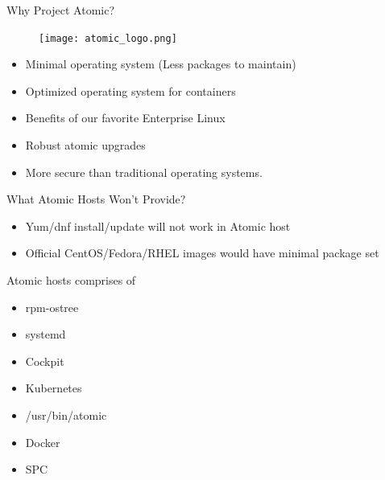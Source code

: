 \documentclass{beamer}
\begin{document}
\begin{frame}{Why Project Atomic?}
\begin{figure}[htp]
\centering
\texttt{[image: atomic\_logo.png]}
\label{}
\end{figure}
\begin{itemize}
  \item Minimal operating system (Less packages to maintain)
  \item Optimized operating system for containers
  \item Benefits of our favorite Enterprise Linux
  \item Robust atomic upgrades
  \item More secure than traditional operating systems.
\end{itemize}
\end{frame}

\begin{frame}{What Atomic Hosts Won't Provide?}
\begin{itemize}
  \item Yum/dnf install/update will not work in Atomic host
  \item Official CentOS/Fedora/RHEL images would have minimal package set
\end{itemize}
\end{frame}

\begin{frame}{Atomic hosts comprises of}
\begin{itemize}
  \item rpm-ostree
  \item systemd
  \item Cockpit
  \item Kubernetes
  \item /usr/bin/atomic
  \item Docker
  \item SPC
\end{itemize}
\end{frame}
\end{document}
